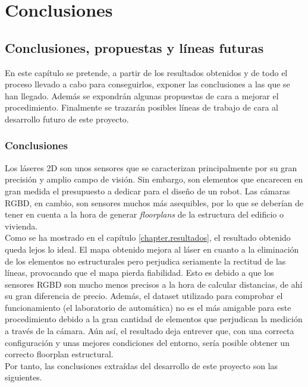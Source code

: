\part{Conclusiones}

\chapter{Conclusiones, propuestas y líneas futuras}

En este capítulo se pretende, a partir de los resultados obtenidos y de todo el proceso llevado a cabo para conseguirlos, exponer las conclusiones a las que se han llegado. Además se expondrán algunas propuestas de cara a mejorar el procedimiento. Finalmente se trazarán posibles líneas de trabajo de cara al desarrollo futuro de este proyecto.\\

\section{Conclusiones}

Los láseres 2D son unos sensores que se caracterizan principalmente por su gran precisión y amplio campo de visión. Sin embargo, son elementos que encarecen en gran medida el presupuesto a dedicar para el diseño de un robot. Las cámaras RGBD, en cambio, son sensores muchos más asequibles, por lo que se deberían de tener en cuenta a la hora de generar \textit{floorplans} de la estructura del edificio o vivienda.\\

Como se ha mostrado en el capítulo \ref{chapter.resultados}, el resultado obtenido queda lejos lo ideal. El mapa obtenido mejora al láser en cuanto a la eliminación de los elementos no estructurales pero perjudica seriamente la rectitud de las líneas, provocando que el mapa pierda fiabilidad. Esto es debido a que los sensores RGBD son mucho menos precisos a la hora de calcular distancias, de ahí su gran diferencia de precio. Además, el dataset utilizado para comprobar el funcionamiento (el laboratorio de automática) no es el más amigable para este procedimiento debido a la gran cantidad de elementos que perjudican la medición a través de la cámara. Aún así, el resultado deja entrever que, con una correcta configuración y unas mejores condiciones del entorno, sería posible obtener un correcto floorplan estructural.\\

Por tanto, las conclusiones extraídas del desarrollo de este proyecto son las siguientes.


